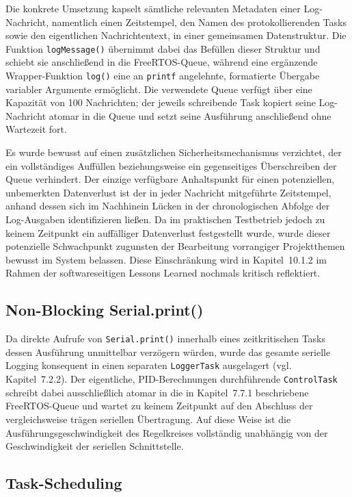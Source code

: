 \documentclass[12pt,ngerman,numbers=noenddot,abstracton,headsepline]{scrreprt}
\begin{document}
Die konkrete Umsetzung kapselt sämtliche relevanten Metadaten einer Log-Nachricht, namentlich einen Zeitstempel, den Namen des protokollierenden Tasks sowie den eigentlichen Nachrichtentext, in einer gemeinsamen Datenstruktur. Die Funktion \texttt{logMessage()} übernimmt dabei das Befüllen dieser Struktur und schiebt sie anschließend in die FreeRTOS-Queue, während eine ergänzende Wrapper-Funktion \texttt{log()} eine an \texttt{printf} angelehnte, formatierte Übergabe variabler Argumente ermöglicht. Die verwendete Queue verfügt über eine Kapazität von 100 Nachrichten; der jeweils schreibende Task kopiert seine Log-Nachricht atomar in die Queue und setzt seine Ausführung anschließend ohne Wartezeit fort.

Es wurde bewusst auf einen zusätzlichen Sicherheitsmechanismus verzichtet, der ein vollständiges Auffüllen beziehungsweise ein gegenseitiges Überschreiben der Queue verhindert. Der einzige verfügbare Anhaltspunkt für einen potenziellen, unbemerkten Datenverlust ist der in jeder Nachricht mitgeführte Zeitstempel, anhand dessen sich im Nachhinein Lücken in der chronologischen Abfolge der Log-Ausgaben identifizieren ließen. Da im praktischen Testbetrieb jedoch zu keinem Zeitpunkt ein auffälliger Datenverlust festgestellt wurde, wurde dieser potenzielle Schwachpunkt zugunsten der Bearbeitung vorrangiger Projektthemen bewusst im System belassen. Diese Einschränkung wird in Kapitel~10.1.2 im Rahmen der softwareseitigen Lessons Learned nochmals kritisch reflektiert.

\subsection{Non-Blocking Serial.print()}
\label{subsec:nonblocking_serial}

Da direkte Aufrufe von \texttt{Serial.print()} innerhalb eines zeitkritischen Tasks dessen Ausführung unmittelbar verzögern würden, wurde das gesamte serielle Logging konsequent in einen separaten \texttt{LoggerTask} ausgelagert (vgl. Kapitel~7.2.2). Der eigentliche, PID-Berechnungen durchführende \texttt{ControlTask} schreibt dabei ausschließlich atomar in die in Kapitel~7.7.1 beschriebene FreeRTOS-Queue und wartet zu keinem Zeitpunkt auf den Abschluss der vergleichsweise trägen seriellen Übertragung. Auf diese Weise ist die Ausführungsgeschwindigkeit des Regelkreises vollständig unabhängig von der Geschwindigkeit der seriellen Schnittstelle.

\subsection{Task-Scheduling}
\label{subsec:logger_scheduling}
\end{document}

